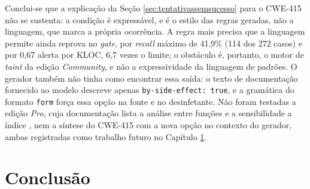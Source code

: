 \documentclass[
    12pt,                %
    openright,           %
    oneside,             %
    a4paper,             %
    english,             %
    brazil               %
]{abntex2}
\newcommand{\novo}[1]{{\color{red}#1}}
\begin{document}
\par
\novo{Conclui-se que a explicação da Seção \ref{sec:tentativassemsucesso} para o CWE-415 não se sustenta: a condição é expressável, e é o estilo das regras geradas, não a linguagem, que marca a própria ocorrência. A regra mais precisa que a linguagem permite ainda reprova no \textit{gate}, por \textit{recall} máximo de 41,9\% (114 dos 272 casos) e por 0,67 alerta por KLOC, 6,7 vezes o limite; o obstáculo é, portanto, o motor de \textit{taint} da edição \textit{Community}, e não a expressividade da linguagem de padrões. O gerador também não tinha como encontrar essa saída: o texto de documentação fornecido ao modelo descreve apenas \texttt{by-side-effect: true}, e a gramática do formato \texttt{form} força essa opção na fonte e no desinfetante. Não foram testadas a edição \textit{Pro}, cuja documentação lista a análise entre funções e a sensibilidade a índice \cite{semgrep2026taintavancado}, nem a síntese do CWE-415 com a nova opção no contexto do gerador, ambas registradas como trabalho futuro no Capítulo \ref{cap:conclusao}.}


\chapter{Conclusão}
\label{cap:conclusao}
\end{document}
